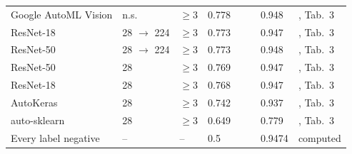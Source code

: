 \begin{table}[t]
\begin{tabular}{@{}llllllll@{}}
Google AutoML Vision & n.s. & $\geq$3 & 0.778 & & & 0.948 & \cite{yang2023medmnist}, Tab.~3 \\
ResNet-18 & 28 $\rightarrow$ 224 & $\geq$3 & 0.773 & & & 0.947 & \cite{yang2023medmnist}, Tab.~3 \\
ResNet-50 & 28 $\rightarrow$ 224 & $\geq$3 & 0.773 & & & 0.948 & \cite{yang2023medmnist}, Tab.~3 \\
ResNet-50 & 28 & $\geq$3 & 0.769 & & & 0.947 & \cite{yang2023medmnist}, Tab.~3 \\
ResNet-18 & 28 & $\geq$3 & 0.768 & & & 0.947 & \cite{yang2023medmnist}, Tab.~3 \\
AutoKeras & 28 & $\geq$3 & 0.742 & & & 0.937 & \cite{yang2023medmnist}, Tab.~3 \\
auto-sklearn & 28 & $\geq$3 & 0.649 & & & 0.779 & \cite{yang2023medmnist}, Tab.~3 \\
\midrule
Every label negative & -- & -- & 0.5 & & & 0.9474 & computed \\
\bottomrule
\end{tabular}
\end{table}
